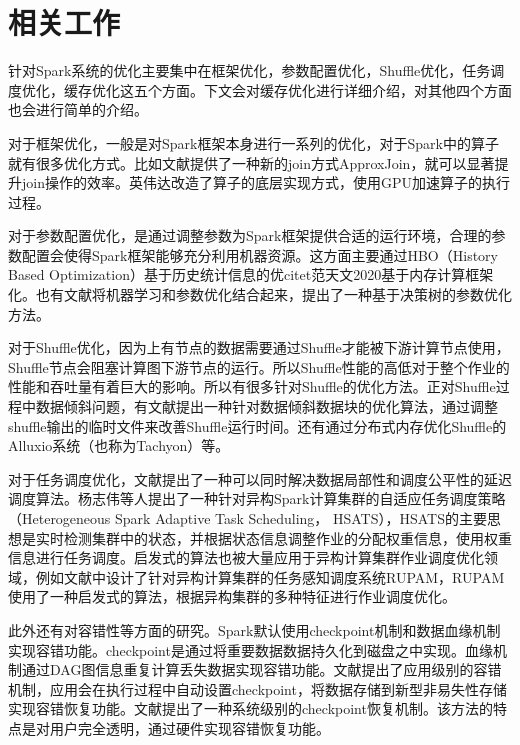 \section{相关工作}
针对Spark系统的优化主要集中在框架优化\cite{罗妮0基于机器学习的内存计算优化关键技术研究}\cite{廖湖声0Spark}，参数配置优化\cite{范天文2020基于内存计算框架}，Shuffle优化\cite{cheng2020ops}\cite{choi2015early}\cite{davidson2013optimizing}\cite{stone1971parallel}\cite{furukawa2001efficient}\cite{liu2017optimizing}\cite{张伟0Spark}\cite{lu2014accelerating}，任务调度优化\cite{杨志伟2016异构}\cite{李源0Spark}，缓存优\cite{kim2017sparkle}化\cite{卞琛2017并行计算框架}\cite{陈康2016Spark}这五个方面。下文会对缓存优化进行详细介绍，对其他四个方面也会进行简单的介绍。

对于框架优化，一般是对Spark框架本身进行一系列的优化，对于Spark中的算子就有很多优化方式。比如文献\cite{罗妮0基于机器学习的内存计算优化关键技术研究}提供了一种新的join方式ApproxJoin，就可以显著提升join操作的效率。英伟达改造了算子的底层实现方式，使用GPU加速算子的执行过程\cite{廖湖声0Spark}。

对于参数配置优化，是通过调整参数为Spark框架提供合适的运行环境，合理的参数配置会使得Spark框架能够充分利用机器资源。这方面主要通过HBO（History Based Optimization）基于历史统计信息的优citet{范天文2020基于内存计算框架}化。也有文献将机器学习和参数优化结合起来，提出了一种基于决策树的参数优化方法\cite{罗妮0基于机器学习的内存计算优化关键技术研究}。

对于Shuffle优化，因为上有节点的数据需要通过Shuffle才能被下游计算节点使用，Shuffle节点会阻塞计算图下游节点的运行。所以Shuffle性能的高低对于整个作业的性能和吞吐量有着巨大的影响。所以有很多针对Shuffle的优化方法。正对Shuffle过程中数据倾斜问题，有文献\cite{cheng2020ops}提出一种针对数据倾斜数据块的优化算法，通过调整shuffle输出的临时文件来改善Shuffle运行时间。还有通过分布式内存优化Shuffle的Alluxio系统\cite{li2018alluxio}（也称为Tachyon\cite{li2014tachyon}）等。

对于任务调度优化，文献\cite{zaharia2016architecture}提出了一种可以同时解决数据局部性和调度公平性的延迟调度算法。杨志伟等人提出了一种针对异构Spark计算集群的自适应任务调度策略（Heterogeneous Spark Adaptive Task Scheduling， HSATS），HSATS的主要思想是实时检测集群中的状态，并根据状态信息调整作业的分配权重信息，使用权重信息进行任务调度。启发式的算法也被大量应用于异构计算集群作业调度优化领域，例如文献中设计了针对异构计算集群的任务感知调度系统RUPAM，RUPAM使用了一种启发式的算法，根据异构集群的多种特征进行作业调度优化。

此外还有对容错性等方面的研究。Spark默认使用checkpoint机制和数据血缘机制实现容错功能。checkpoint是通过将重要数据数据持久化到磁盘之中实现\cite{ananthanarayanan2012pacman}。血缘机制通过DAG图信息重复计算丢失数据实现容错功能\cite{zaharia2010spark}。文献\cite{zaharia2012resilient}提出了应用级别的容错机制，应用会在执行过程中自动设置checkpoint，将数据存储到新型非易失性存储实现容错恢复功能。文献\cite{dimitriou2015retrial}提出了一种系统级别的checkpoint恢复机制。该方法的特点是对用户完全透明，通过硬件实现容错恢复功能。

